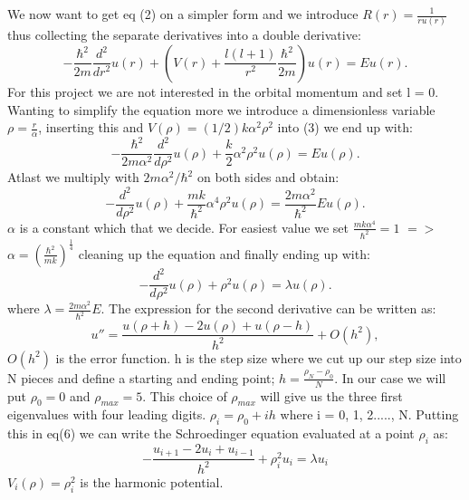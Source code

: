 \documentclass[twocolumn]{article}
\begin{document}
We now want to get eq (2) on a simpler form and we introduce $R(r) = \frac{1}{r u(r)}$ thus collecting the separate derivatives into a double derivative:
\begin{equation}
  -\frac{\hbar^2}{2 m} \frac{d^2}{dr^2} u(r) 
       + \left ( V(r) + \frac{l (l + 1)}{r^2}\frac{\hbar^2}{2 m}
                                    \right ) u(r)  = E u(r) .
\end{equation}
For this project we are not interested in the orbital momentum and set l = 0. Wanting to simplify the equation more we introduce a dimensionless variable $\rho = \frac{r}{\alpha}$, inserting this and $V(\rho) = (1/2) k \alpha^2\rho^2$ into (3) we end up with:
\begin{equation}
  -\frac{\hbar^2}{2 m \alpha^2} \frac{d^2}{d\rho^2} u(\rho) 
       + \frac{k}{2} \alpha^2\rho^2u(\rho)  = E u(\rho) .
\end{equation}
Atlast we multiply with $2m\alpha^2/\hbar^2$ on both sides and obtain:
\begin{equation}
  -\frac{d^2}{d\rho^2} u(\rho) 
       + \frac{mk}{\hbar^2} \alpha^4\rho^2u(\rho)  = \frac{2m\alpha^2}{\hbar^2}E u(\rho) .
\end{equation}
$\alpha$ is a constant which that we decide. For easiest value we set $\frac{mk\alpha^4}{\hbar^2} = 1$ $=>$ $\alpha = (\frac{\hbar^2}{mk})^\frac{1}{4}$ cleaning up the equation and finally ending up with:    
\begin{equation*}
  -\frac{d^2}{d\rho^2} u(\rho) + \rho^2u(\rho)  = \lambda u(\rho) .
\end{equation*}
where $\lambda = \frac{2m\alpha^2}{\hbar^2}E$. 
The expression for the second derivative can be written as:
\begin{equation}
u''=\frac{u(\rho+h) -2u(\rho) +u(\rho-h)}{h^2} +O(h^2),
\end{equation}
$O(h^2)$ is the error function. h is the step size where we cut up our step size into N pieces and define a starting and ending point; $h = \frac{\rho_N - \rho_0}{N}$. In our case we will put $\rho_0 = 0$ and $\rho_{max} = 5$. This choice of $\rho_{max}$ will give us the three first eigenvalues with four leading digits. $\rho_i = \rho_0 + ih $ where i = 0, 1, 2....., N. 
Putting this in eq(6) we can write the Schroedinger equation evaluated at a point $\rho_i$ as:
\begin{equation}
-\frac{u_{i+1} -2u_i +u_{i-1} }{h^2}+\rho^2_iu_i  = \lambda u_i
\end{equation}
$V_i(\rho) = \rho^2_i$ is the harmonic potential.
\end{document}
